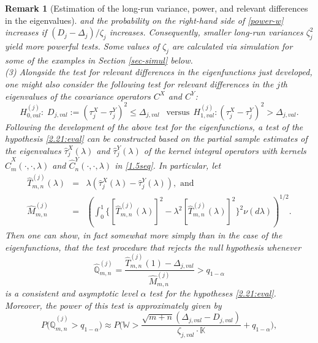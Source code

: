 \documentclass[11pt]{article}
\newtheorem{rem}{Remark}[section]
\numberwithin{equation}{section}
\numberwithin{theorem}{section}
\numberwithin{lemma}{section}
\numberwithin{proposition}{section}
\numberwithin{cor}{section}
\numberwithin{definition}{section}
\numberwithin{cons}{section}
\numberwithin{rem}{section}
\numberwithin{exa}{section}
\numberwithin{table}{section}
\numberwithin{figure}{section}
\numberwithin{algo}{section}
\begin{document}
{{\begin{rem}[Estimation of the long-run variance, power, and  relevant differences in the eigenvalues]
{and the probability on the right-hand side of  \eqref{power-w} increases if $(D_j-\Delta_j)/\zeta_j$ increases. Consequently, smaller long-run variances $\zeta_j^2$ yield more powerful tests. Some values of $\zeta_j$ are calculated via simulation for some of the examples in Section \ref{sec-simul} below.
\\
(3)
Alongside the test for relevant differences in the eigenfunctions just developed, one might also consider the following test for relevant differences in the $j$th eigenvalues
of the covariance operators $C^{X}$ and $C^{Y}$:
\begin{equation}\label{2.21:eval}
    H^{(j)}_{0,val} : \;  D_{j,val} :=
    ( \tau^X_j - \tau^Y_j  )^2 \leq \Delta_{j,val} ~~\mbox{ versus}  ~~    H^{(j)}_{1,val} :   ( \tau^X_j - \tau^Y_j  )^2  > \Delta_{j,val}.
  \end{equation}
Following the development of the above test for the eigenfunctions, a test of the hypothesis \eqref{2.21:eval} can be constructed based on the partial sample estimates of the eigenvalues $\hat{\tau}_j^{X}(\lambda)$  and $\hat{\tau}_j^{Y}(\lambda)$ of the kernel integral operators with kernels $\hat{C}_m^X (\cdot, \cdot , \lambda) $ and $\hat{C}_n^Y (\cdot, \cdot , \lambda) $ in \eqref{1.5seq}.
In particular, let
\begin{eqnarray*}
\hat{T}_{m,n}^{(j)}(\lambda) &=& \lambda (\hat{\tau}_j^{X}(\lambda)-\hat{\tau}_j^{Y}(\lambda)), \mbox{ and } \\
\hat{M}_{m,n}^{(j)} &=&  \left(\int_{0}^{1}\{[\hat{T}_{m,n}^{(j)}(\lambda)]^2-\lambda^2[\hat{T}_{m,n}^{(j)}(\lambda)]^2\}^2 \nu(d\lambda)\right)^{1/2}.
\end{eqnarray*}
Then  one  can show, in fact somewhat more simply than in the case of the eigenfunctions, that the test procedure that rejects the null hypothesis whenever
\begin{equation}\label{testval}
\hat{\mathbb{Q}}^{(j)}_{m,n} = \frac{\hat{T}_{m,n}^{(j)}(1)- \Delta_{j,val}} {\hat{M}_{m,n}^{(j)}}  > q_{1-\alpha}
\end{equation}
is a consistent and  asymptotic  level $\alpha$ test for the hypotheses \eqref{2.21:eval}. Moreover, the power of this test is approximately given by
\begin{equation}\label{power-wq}
P\big ( \hat{\mathbb{Q}}^{(j)}_{m,n}  > q_{1 - \alpha} \big )  \approx P\Big ({\mathbb{W}} > \frac{\sqrt{m+n}(\Delta_{j,val} - D_{j,val})}{\zeta_{j,val}  \cdot \mathbb{K} } +   q_{1 - \alpha}\Big),
\end{equation}
}
\end{rem}}}
\end{document}
